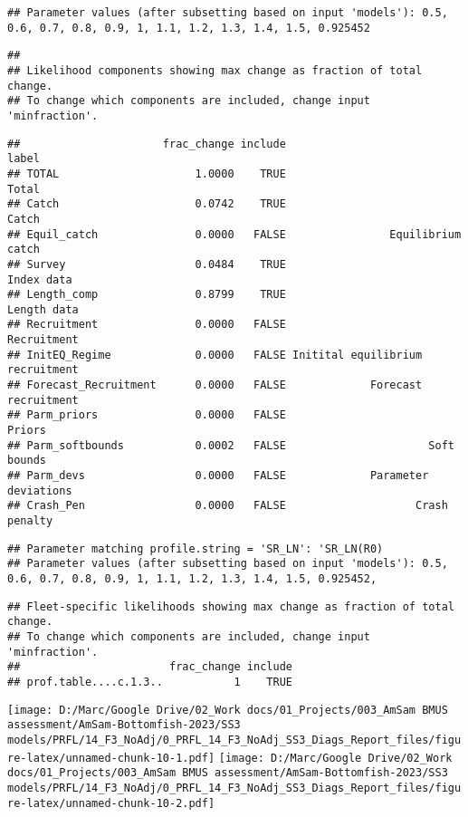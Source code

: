 \documentclass[
]{article}
\begin{document}
\begin{verbatim}
## Parameter values (after subsetting based on input 'models'): 0.5, 0.6, 0.7, 0.8, 0.9, 1, 1.1, 1.2, 1.3, 1.4, 1.5, 0.925452
\end{verbatim}

\begin{verbatim}
## 
## Likelihood components showing max change as fraction of total change.
## To change which components are included, change input 'minfraction'.
\end{verbatim}

\begin{verbatim}
##                      frac_change include                            label
## TOTAL                     1.0000    TRUE                            Total
## Catch                     0.0742    TRUE                            Catch
## Equil_catch               0.0000   FALSE                Equilibrium catch
## Survey                    0.0484    TRUE                       Index data
## Length_comp               0.8799    TRUE                      Length data
## Recruitment               0.0000   FALSE                      Recruitment
## InitEQ_Regime             0.0000   FALSE Initital equilibrium recruitment
## Forecast_Recruitment      0.0000   FALSE             Forecast recruitment
## Parm_priors               0.0000   FALSE                           Priors
## Parm_softbounds           0.0002   FALSE                      Soft bounds
## Parm_devs                 0.0000   FALSE             Parameter deviations
## Crash_Pen                 0.0000   FALSE                    Crash penalty
\end{verbatim}

\begin{verbatim}
## Parameter matching profile.string = 'SR_LN': 'SR_LN(R0)
## Parameter values (after subsetting based on input 'models'): 0.5, 0.6, 0.7, 0.8, 0.9, 1, 1.1, 1.2, 1.3, 1.4, 1.5, 0.925452,
\end{verbatim}

\begin{verbatim}
## Fleet-specific likelihoods showing max change as fraction of total change.
## To change which components are included, change input 'minfraction'.
##                       frac_change include
## prof.table....c.1.3..           1    TRUE
\end{verbatim}

\texttt{[image: D:/Marc/Google Drive/02\_Work docs/01\_Projects/003\_AmSam BMUS assessment/AmSam-Bottomfish-2023/SS3 models/PRFL/14\_F3\_NoAdj/0\_PRFL\_14\_F3\_NoAdj\_SS3\_Diags\_Report\_files/figure-latex/unnamed-chunk-10-1.pdf]}
\texttt{[image: D:/Marc/Google Drive/02\_Work docs/01\_Projects/003\_AmSam BMUS assessment/AmSam-Bottomfish-2023/SS3 models/PRFL/14\_F3\_NoAdj/0\_PRFL\_14\_F3\_NoAdj\_SS3\_Diags\_Report\_files/figure-latex/unnamed-chunk-10-2.pdf]}
\end{document}
